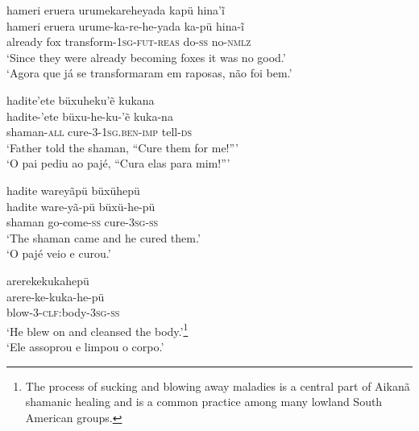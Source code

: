 \documentclass[output=paper,
modfonts,nonflat
]{langsci/langscibook}
\begin{document}
\largerpage[2]
\ea     hameri eruera urumekareheyada kapü hina'ĩ \\[.3em]
\gll 	hameri eruera urume-ka-re-he-yada ka-pü hina-ĩ\\
already fox transform-\textsc{1sg-fut-reas} do-\textsc{ss} no-\textsc{nmlz}\\
\glt   `Since they were already becoming foxes it was no good.' \\
`Agora que já se transformaram em raposas, não foi bem.'
\z

\ea   hadite'ete büxuheku'ẽ kukana \\[.3em]
\gll 	hadite-'ete büxu-he-ku-'ẽ kuka-na \\
shaman-\textsc{all} cure-3-\textsc{1sg.ben-imp} tell-\textsc{ds}\\
\glt    `Father told the shaman, ``Cure them for me!{''}' \\
`O pai pediu ao pajé, ``Cura elas para mim!{''}'
\z

\ea  hadite wareyãpü büxühepü  \\[.3em]
\gll 	hadite ware-yã-pü büxü-he-pü\\
shaman  go-come-\textsc{ss} cure-\textsc{3sg-ss}\\
\glt `The shaman came and he cured them.' \\
`O pajé veio e curou.' \\
\z

\ea   arerekekukahepü    \\[.3em]
\gll 	arere-ke-kuka-he-pü \\
blow-\textsc{3}-\textsc{clf}:body-3\textsc{sg}-\textsc{ss}\\                       
\glt `He blew on and cleansed the body.'\footnote{The process of sucking and blowing away maladies is a central part of Aikanã shamanic healing and is a common practice among many lowland South American groups.}    \\
`Ele assoprou e limpou o corpo.' \\
\z
\end{document}
